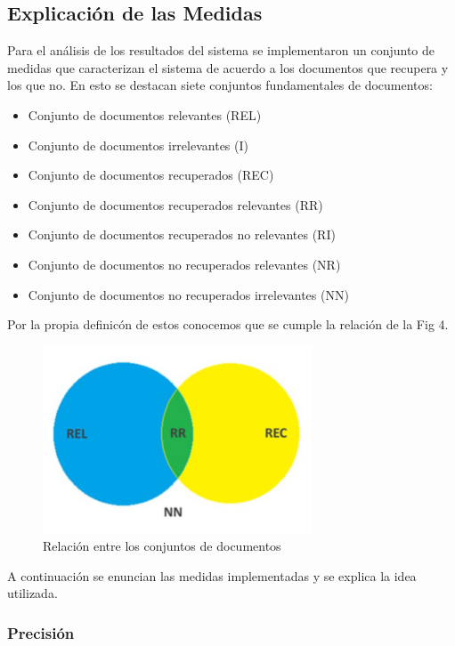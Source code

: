 \documentclass[runningheads]{llncs}
\begin{document}
	\subsection{Explicaci\'on de las Medidas}
	Para el an\'alisis de los resultados del sistema se implementaron un conjunto de medidas que caracterizan el sistema de acuerdo a los documentos que recupera y los que no. En esto se destacan siete conjuntos fundamentales de documentos:
	\begin{itemize}
	\item Conjunto de documentos relevantes (REL)
	\item Conjunto de documentos irrelevantes (I)
	\item Conjunto de documentos recuperados (REC)
	\item Conjunto de documentos recuperados relevantes (RR)
	\item Conjunto de documentos recuperados no relevantes (RI)
	\item Conjunto de documentos no recuperados relevantes (NR)
	\item Conjunto de documentos no recuperados irrelevantes (NN)
	\end{itemize}
	
	Por la propia definic\'on de estos conocemos que se cumple la relaci\'on de la Fig 4.
	
	\begin{figure}[h]
		\begin{center}
			\includegraphics[width =8.0cm]{Diagrama.png}
			\caption[Fig 4]{Relaci\'on entre los conjuntos de documentos}		
		\end{center}
	\end{figure}
	
	A continuaci\'on se enuncian las medidas implementadas y se explica la idea utilizada.
	
\subsubsection{Precisi\'on }
\end{document}
